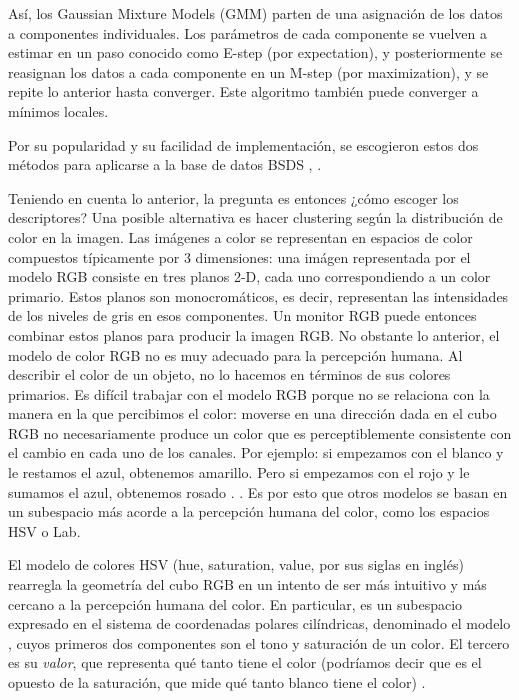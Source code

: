 \documentclass[10pt,twocolumn,letterpaper]{article}
\begin{document}
Así, los Gaussian Mixture Models (GMM) parten de una asignación de los datos a componentes individuales. Los parámetros de cada componente se vuelven a estimar en un paso conocido como E-step (por expectation), y posteriormente se reasignan los datos a cada componente en un M-step (por maximization), y se repite lo anterior hasta converger. Este algoritmo también puede converger a mínimos locales.

Por su popularidad y su facilidad de implementación, se escogieron estos dos métodos para aplicarse a la base de datos BSDS \cite{MartinFTM01}, \cite{8_berkeley.edu}. 

Teniendo en cuenta lo anterior, la pregunta es entonces ¿cómo escoger los descriptores? Una posible alternativa es hacer clustering según la distribución de color en la imagen. Las imágenes a color se representan en espacios de color compuestos típicamente por 3 dimensiones: una imágen representada por el modelo RGB consiste en tres planos 2-D, cada uno correspondiendo a un color primario. Estos planos son monocromáticos, es decir, representan las intensidades de los niveles de gris en esos componentes. Un monitor RGB puede entonces combinar estos planos para producir la imagen RGB. No obstante lo anterior, el modelo de color RGB no es muy adecuado para la percepción humana.  Al describir el color de un objeto, no lo hacemos en términos de sus colores primarios.  Es difícil trabajar con el modelo RGB porque no se relaciona con la manera en la que percibimos el color: moverse en una dirección dada en el cubo RGB no necesariamente produce un color que es perceptiblemente consistente con el cambio en cada uno de los canales. Por ejemplo: si empezamos con el blanco y le restamos el azul, obtenemos amarillo. Pero si empezamos con el rojo y le sumamos el azul, obtenemos rosado \cite{3_solomon_breckon_2011}. . Es por esto que otros modelos se basan en un subespacio más acorde a la percepción humana del color, como los espacios HSV o Lab.  

El modelo de colores HSV (hue, saturation, value, por sus siglas en inglés) rearregla la geometría del cubo RGB en un intento de ser más intuitivo y más cercano a la percepción humana del color. En particular, es un subespacio expresado en el sistema de coordenadas polares cilíndricas, denominado el modelo , cuyos primeros dos componentes son el tono y saturación de un color. El tercero es su \textit{valor}, que representa qué tanto  tiene el color (podríamos decir que es el opuesto de la saturación, que mide qué tanto blanco tiene el color) \cite{9_smith_1978}.
\end{document}
